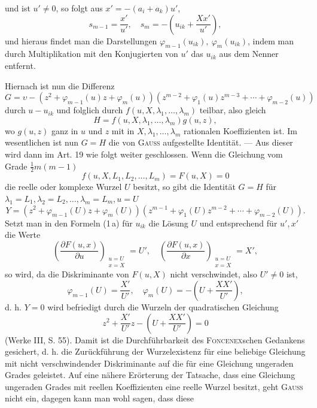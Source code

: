 und ist \(u'\ne0\), so folgt aus \(x'=-(a_i+a_k)u'\),
\begingroup\makeatletter\tagsleft@true\let\veqno\leqno\makeatother
\begin{equation*}
s_{m-1}=\frac{x'}{u'},\quad s_m=-\left(u_{ik}+\frac{Xx'}{u'}\right),\tag{1\,a}
\end{equation*}
\endgroup
\noindent und hieraus findet man die Darstellungen \(\varphi_{m-1}(u_{ik}),\ \varphi_m(u_{ik})\), indem man durch
Multiplikation mit den Konjugierten von \(u'\) das \(u_{ik}\) aus dem Nenner entfernt.
\par
Hiernach ist nun die Differenz
\[
G=\upsilon-(z^2+\varphi_{m-1}(u)z+\varphi_m(u))(z^{m-2}+\varphi_1(u)z^{m-3}+\cdots+\varphi_{m-2}(u))
\]
durch \(u-u_{ik}\) und folglich durch \(f(u,X,\lambda_1,\ldots,\lambda_m)\) teilbar, also gleich
\[
H=f(u,X,\lambda_1,\ldots,\lambda_m)g(u,z),
\]
wo \(g(u,z)\) ganz in \(u\) und \(z\) mit in \(X,\lambda_1,\ldots,\lambda_m\) rationalen Koeffizienten ist.
Im wesentlichen ist nun \(G=H\) die von \textsc{Gauss} aufgestellte Identität. — Aus
dieser wird dann im Art. 19 wie folgt weiter geschlossen. Wenn die Gleichung
vom Grade \(\tfrac12m(m-1)\)
\[
f(u,X,L_1,L_2,\ldots,L_m)=F(u,X)=0
\]
die reelle oder komplexe Wurzel \(U\) besitzt, so gibt die Identität \(G=H\) für
\(\lambda_1=L_1,\lambda_2=L_2,\ldots,\lambda_m=L_m,u=U\)
\[
Y=(z^2+\varphi_{m-1}(U)z+\varphi_m(U))(z^{m-1}+\varphi_1(U)z^{m-2}+\cdots+\varphi_{m-2}(U)).
\]
Setzt man in den Formeln (1\,a) für \(u_{ik}\) die Lösung \(U\) und entsprechend für
\(u',x'\) die Werte
\[
\left(\frac{\partial F(u,x)}{\partial u}\right)_{\substack{u=U\\x=X}}=U',\quad
\left(\frac{\partial F(u,x)}{\partial x}\right)_{\substack{u=U\\x=X}}=X',
\]
so wird, da die Diskriminante von \(F(u,X)\) nicht verschwindet, also \(U'\ne0\) ist,
\[
\varphi_{m-1}(U)=\frac{X'}{U'},\quad\varphi_m(U)=-\left(U+\frac{XX'}{U'}\right),
\]
\clearpage{}
\noindent d. h. \(Y=0\) wird befriedigt durch die Wurzeln der quadratischen Gleichung
\[
z^2+\frac{X'}{U'}z-\left(U+\frac{XX'}{U'}\right)=0
\]
(Werke III, S. 55). Damit ist die Durchführbarkeit des \textsc{Foncenex}schen Gedankens
gesichert, d. h. die Zurückführung der Wurzelexistenz für eine beliebige
Gleichung mit nicht verschwindender Diskriminante auf die für eine
Gleichung ungeraden Grades geleistet. Auf eine nähere Erörterung der Tatsache,
dass eine Gleichung ungeraden Grades mit reellen Koeffizienten eine reelle
Wurzel besitzt, geht \textsc{Gauss} nicht ein, dagegen kann man wohl sagen, dass diese
